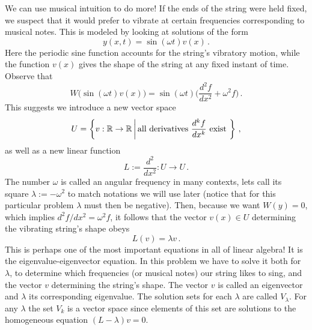 \begin{example}
We can use musical intuition to do more! If the ends of the string were held fixed, we suspect that it would prefer to vibrate at certain frequencies corresponding to musical notes.
This is modeled by looking at solutions of the form
$$
y(x,t)=\sin(\omega t) v(x)\, .
$$
Here the periodic sine function accounts for the string's vibratory motion, while the function $v(x)$ gives the shape of the string at any fixed instant of time. Observe that
$$
W\big(\sin(\omega t) v(x)\big)=\sin(\omega t)\big(\frac{d^2f}{dx^2}+\omega^2 f\big)\, .
$$
This suggests we introduce a new vector space $$U=\left\{v:{\mathbb R}\to {\mathbb R}\, \middle| \, \mbox{\rm all derivatives } \frac{d^kf}{d x^k }\text{~exist~} \right\}\, ,
$$
as well as a new linear function
$$
L:=\frac{d^2}{dx^2}: U\longrightarrow U\, .
$$
The number $\omega$ is called an angular frequency in many contexts, lets call its square $\lambda:=-\omega^2$ to match notations we will use later (notice that for this particular problem $\lambda$ must then  be negative).
Then, because we want $W(y)=0$, which implies $d^2 f/dx^2=\omega^2 f$, it follows that the vector $v(x)\in U$ determining the vibrating string's shape obeys
$$
L(v)=\lambda v\, .
$$
This is perhaps one of the most important equations in all of linear algebra! It is the eigenvalue-eigenvector equation. In this problem we have to solve it both for $\lambda$, to determine which frequencies (or musical notes) our string likes to sing, and the vector $v$ determining the string's shape. The vector $v$ is called an eigenvector and $\lambda$ its corresponding eigenvalue.
The solution sets for each $\lambda$ are called $V_\lambda$. For any $\lambda$ the set $V_k$ is a vector space since elements of this set are solutions to the homogeneous equation $(L-\lambda)v=0.$ 



\end{example}

